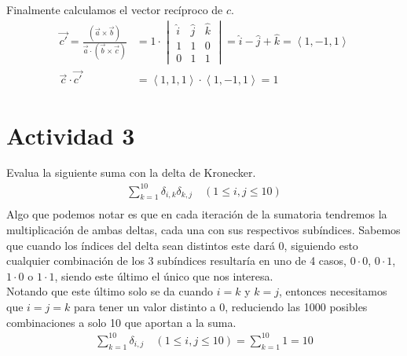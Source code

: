 \documentclass{article}
\newcommand{\custvec}[1]{\left\langle#1\right\rangle}
\begin{document}
Finalmente calculamos el vector recíproco de $c$.
\begin{equation*}
    \begin{split}
        \vec{c'} = \frac{(\vec{a}\times \vec{b})}{\vec{a}\cdot (\vec{b}\times \vec{c})} &= 1\cdot \begin{vmatrix}
        \hat{i} & \hat{j} & \hat{k} \\
        1 & 1 & 0 \\
        0 & 1 & 1
        \end{vmatrix} = \hat{i} - \hat{j} + \hat{k} = \custvec{1,-1,1}\\
        \vec{c}\cdot \vec{c'} &= \custvec{1,1,1}\cdot \custvec{1,-1,1} = 1 
    \end{split}
\end{equation*}
\newpage
\section{Actividad 3}
Evalua la siguiente suma con la delta de Kronecker.\\
\begin{equation*}
    \begin{split}
       \sum\limits_{k=1}^{10} \delta_{i,k}\delta_{k,j}\quad(1\leq i,j \leq 10)\\
    \end{split}
\end{equation*}
Algo que podemos notar es que en cada iteración de la sumatoria tendremos la multiplicación de ambas deltas, cada una con sus respectivos subíndices. Sabemos que cuando los índices del delta sean distintos este dará 0, siguiendo esto cualquier combinación de los 3 subíndices resultaría en uno de 4 casos, $0\cdot 0$, $0\cdot 1$, $1\cdot 0$ o $1\cdot1$, siendo este último el único que nos interesa.\\

Notando que este último solo se da cuando $i=k$ y $k=j$, entonces necesitamos que $i=j=k$ para tener un valor distinto a 0, reduciendo las 1000 posibles combinaciones a solo 10 que aportan a la suma.\\
\begin{equation*}
    \begin{split}
       \sum\limits_{k=1}^{10}\delta_{i,j}\quad (1\leq i,j \leq 10) = \sum\limits_{k=1}^{10}1 = 10\\
    \end{split}
\end{equation*}
\newpage
\end{document}
